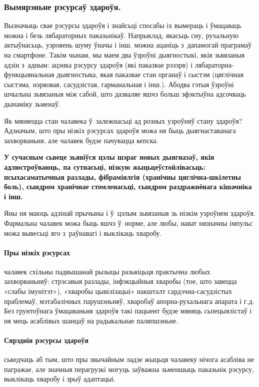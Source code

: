 \subsubsection{Вымярэньне рэсурсаў здароўя.}

Вызначыць свае рэсурсы здароўя і знайсьці спосабы іх вымераць і ўмацаваць можна і безь лябараторных паказьнікаў. Напрыклад, якасьць сну, рухальную актыўнасьць, узровень шуму ўначы і інш. можна ацаніць з~дапамогай праграмаў на смартфоне. Такім чынам, мы маем два ўзроўні дыягностыкі, якія зьвязаныя адзін з~адным: ацэнка рэсурсу здароўя (які паказвае рэзэрв) і лябараторна-функцыянальная дыягностыка, якая паказвае стан органаў і сыстэм (цяглічная сыстэма, нэрвовая, сасудзістая, гарманальная і інш.). Абодва гэтыя ўзроўні шчыльна зьвязаныя між сабой, што дазваляе яшчэ больш эфэктыўна адсочваць дынаміку зьменаў.

Як мяняецца стан чалавека ў~залежнасьці ад розных узроўняў стану здароўя? Адзначым, што пры нізкіх рэсурсах здароўя можа ня быць дыягнаставанага захворваньня, але чалавек будзе пачувацца кепска. 

\textbf{У сучасным сьвеце зьявіўся цэлы шэраг новых дыягназаў, якія адлюстроўваюць, па сутнасьці, нізкую жыцьцеўстойлівасьць: псыхасаматычныя разлады, фібраміялгія (хранічны цяглічна-шкілетны боль), сындром хранічнае стомленасьці, сындром раздражнёнага кішачніка і інш.}

Яны ня маюць адзінай прычыны і ў~цэлым зьвязаныя зь нізкім узроўнем здароўя. Фармальна чалавек можа быць яшчэ ў~норме, але любы, нават нязначны імпульс можа вывесьці яго з~раўнавагі і выклікаць хваробу.

\paragraph{Пры нізкіх рэсурсах} чалавек схільны падвышанай рызыцы разьвіцьця практычна любых захворваньняў: стрэсавыя разлады, інфэкцыйныя хваробы (тое, што завецца «слабы імунітэт»), «хваробы цывілізацыі» накшталт сардэчна-сасудзістых праблемаў, мэтабалічных парушэньняў, хваробаў апорна-рухальнага апарата і г.д. Без грунтоўнага ўмацаваньня здароўя такі пацыент будзе мяняць сьпецыялістаў і ня мець асаблівых шанцаў на радыкальнае паляпшэньне.

\paragraph{Сярэднія рэсурсы здароўя} сьведчаць аб тым, што пры звычайным ладзе жыцьця чалавеку нічога асабліва не пагражае, але значныя перагрузкі могуць заўважна зьменшыць паказьнік рэсурсу, выклікаць хваробу і зрыў адаптацыі. 

